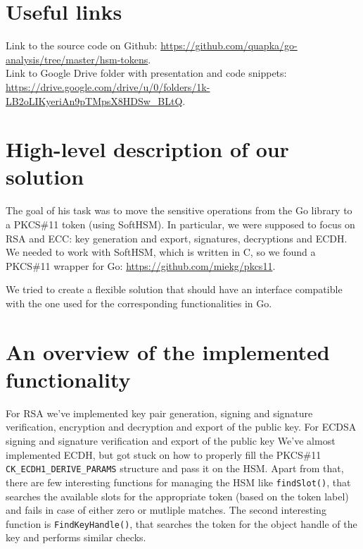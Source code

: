 \documentclass[a4paper]{scrartcl}
\subtitle{}
\begin{document}

\section{Useful links}
Link to the source code on Github: \url{https://github.com/quapka/go-analysis/tree/master/hsm-tokens}.\\
Link to Google Drive folder with presentation and code snippets: \url{https://drive.google.com/drive/u/0/folders/1k-LB2oLIKyeriAn9pTMpsX8HDSw_BLtQ}.

\section{High-level description of our solution }
The goal of his task was to move the sensitive operations from the Go library to a PKCS\#11 token (using SoftHSM). In particular, we were supposed to focus on RSA and ECC: key generation and export, signatures, decryptions and ECDH. We needed to work with SoftHSM, which is written in C, so we found a PKCS\#11 wrapper for Go: \url{https://github.com/miekg/pkcs11}.

We tried to create a flexible solution that should have an interface compatible with the one used for the corresponding functionalities in Go.


\section{An overview of the implemented functionality}
For RSA we've implemented key pair generation, signing and signature verification, encryption and decryption and export of the public key. For ECDSA signing and signature verification and export of the public key We've almost implemented ECDH, but got stuck on how to properly fill the PKCS\#11 \verb+CK_ECDH1_DERIVE_PARAMS+ structure and pass it on the HSM. Apart from that, there are few interesting functions for managing the HSM like \lstinline[columns=fixed]{findSlot()}, that searches the available slots for the appropriate token (based on the token label) and fails in case of either zero or mutliple matches. The second interesting function is \lstinline[columns=fixed]{FindKeyHandle()}, that searches the token for the object handle of the key and performs similar checks.
\end{document}
